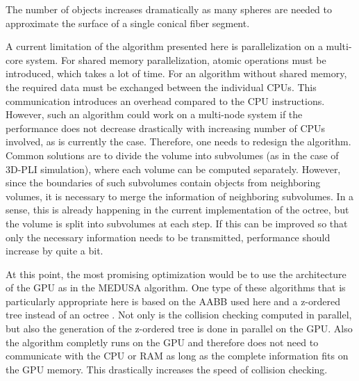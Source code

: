 The number of objects increases dramatically as many spheres are needed to approximate the surface of a single conical fiber segment.
\par
% 
A current limitation of the algorithm presented here is parallelization on a multi-core system.
For shared memory parallelization, atomic operations must be introduced, which takes a lot of time.
For an algorithm without shared memory, the required data must be exchanged between the individual CPUs. 
This communication introduces an overhead compared to the \ac{CPU} instructions.
However, such an algorithm could work on a multi-node system if the performance does not decrease drastically with increasing number of CPUs involved, as is currently the case.
Therefore, one needs to redesign the algorithm.
Common solutions are to divide the volume into subvolumes (as in the case of \ac{3D-PLI} simulation), where each volume can be computed separately.
However, since the boundaries of such subvolumes contain objects from neighboring volumes, it is necessary to merge the information of neighboring subvolumes.
In a sense, this is already happening in the current implementation of the octree, but the volume is split into subvolumes at each step.
If this can be improved so that only the necessary information needs to be transmitted, performance should increase by quite a bit.
\par
% 
At this point, the most promising optimization would be to use the architecture of the \ac{GPU} as in the \ac{MEDUSA} algorithm.
One type of these algorithms that is particularly appropriate here is based on the \ac{AABB} used here and a z-ordered tree instead of an octree \cite{Karras2012}.
Not only is the collision checking computed in parallel, but also the generation of the z-ordered tree is done in parallel on the \ac{GPU}.
Also the algorithm completly runs on the \ac{GPU} and therefore does not need to communicate with the \ac{CPU} or \ac{RAM} as long as the complete information fits on the \ac{GPU} memory.
This drastically increases the speed of collision checking.
% 
% 
% 
